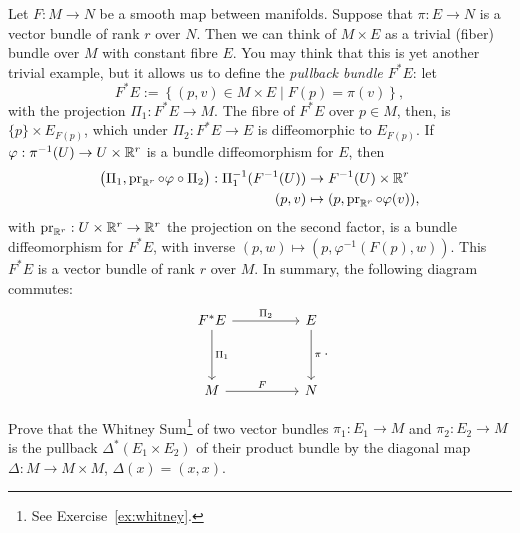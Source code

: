 \begin{example}
	Let $F: M\to N$ be a smooth map between manifolds. Suppose that $\pi: E \to N$ is a vector bundle of rank $r$ over $N$.
	Then we can think of $M\times E$ as a trivial (fiber) bundle over $M$ with constant fibre $E$.
	You may think that this is yet another trivial example, but it allows us to define the \emph{pullback bundle $F^* E$}: let
	\begin{equation}
		F^* E := \left\lbrace (p, v) \in M\times E \mid F(p) = \pi(v)\right\rbrace,
	\end{equation}
	with the projection $\Pi_1: F^* E \to M$.
	The fibre of $F^*E$ over $p\in M$, then, is $\{p\}\times E_{F(p)}$, which under $\Pi_2:F^* E \to E$ is diffeomorphic to $E_{F(p)}$.
	If $\varphi : \pi^{-1}(U) \to U\times\mathbb{R}^r$ is a bundle diffeomorphism for $E$, then
	\begin{align}
		\bigl(\Pi_1, \operatorname{pr}_{\mathbb{R}^r}\circ\varphi\circ\Pi_2\bigr): \Pi_1^{-1}(F^{-1}(U)) & \to F^{-1}(U)\times\mathbb{R}^r                        \\
		(p,v)                                                                                     & \mapsto (p, \operatorname{pr}_{\mathbb{R}^r}\circ\varphi(v)),
	\end{align}
	with $\operatorname{pr}_{\mathbb{R}^r}:U\times\mathbb{R}^r\to\mathbb{R}^r$ the projection on the second factor, is a bundle diffeomorphism for $F^*E$, with inverse $(p,w)\mapsto(p,\varphi^{-1}(F(p),w))$.
	This $F^*E$ is a vector bundle of rank $r$ over $M$.
	In summary, the following diagram commutes:
	\begin{equation}
		\begin{tikzcd}[row sep=huge, column sep=huge]
			F^* E \arrow[r, "\Pi_2"] \arrow[d, "\Pi_1"]
			& E \arrow[d, "\pi"] \\
			M \arrow[r, "F"]
			& N
		\end{tikzcd}.
	\end{equation}
\end{example}

\begin{exercise}
	Prove that the Whitney Sum\footnote{See Exercise~\ref{ex:whitney}.}
	of two vector bundles $\pi_1 : E_1 \to M$ and $\pi_2 : E_2 \to M$
	is the pullback $\Delta^*(E_1 \times E_2)$ of their product bundle by the diagonal map
	$\Delta : M \to M \times M$, $\Delta(x) = (x, x)$.
\end{exercise}

